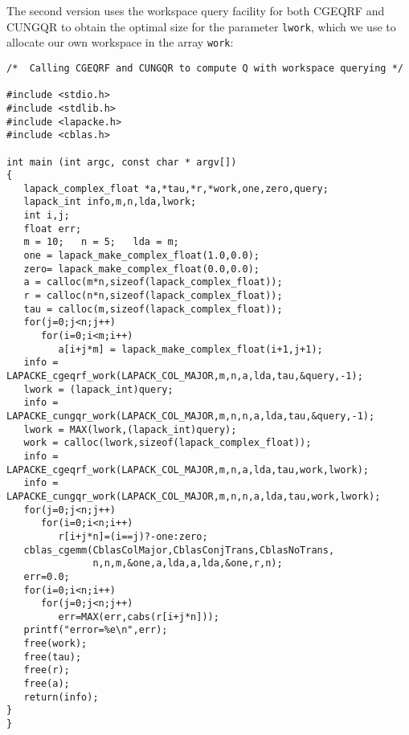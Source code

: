 The second version uses the workspace query facility for both CGEQRF and CUNGQR to obtain the optimal size for the parameter {\tt lwork}, 
which we use to allocate our own workspace in the array {\tt work}:

\begin{verbatim}
/*  Calling CGEQRF and CUNGQR to compute Q with workspace querying */

#include <stdio.h>
#include <stdlib.h>
#include <lapacke.h>
#include <cblas.h>

int main (int argc, const char * argv[])
{
   lapack_complex_float *a,*tau,*r,*work,one,zero,query;
   lapack_int info,m,n,lda,lwork;
   int i,j;
   float err;
   m = 10;   n = 5;   lda = m;
   one = lapack_make_complex_float(1.0,0.0);
   zero= lapack_make_complex_float(0.0,0.0);
   a = calloc(m*n,sizeof(lapack_complex_float));
   r = calloc(n*n,sizeof(lapack_complex_float));
   tau = calloc(m,sizeof(lapack_complex_float));
   for(j=0;j<n;j++)
      for(i=0;i<m;i++)
         a[i+j*m] = lapack_make_complex_float(i+1,j+1);
   info = LAPACKE_cgeqrf_work(LAPACK_COL_MAJOR,m,n,a,lda,tau,&query,-1);
   lwork = (lapack_int)query;
   info = LAPACKE_cungqr_work(LAPACK_COL_MAJOR,m,n,n,a,lda,tau,&query,-1);
   lwork = MAX(lwork,(lapack_int)query);
   work = calloc(lwork,sizeof(lapack_complex_float));
   info = LAPACKE_cgeqrf_work(LAPACK_COL_MAJOR,m,n,a,lda,tau,work,lwork);
   info = LAPACKE_cungqr_work(LAPACK_COL_MAJOR,m,n,n,a,lda,tau,work,lwork);
   for(j=0;j<n;j++)
      for(i=0;i<n;i++)
         r[i+j*n]=(i==j)?-one:zero;
   cblas_cgemm(CblasColMajor,CblasConjTrans,CblasNoTrans,
               n,n,m,&one,a,lda,a,lda,&one,r,n);
   err=0.0;
   for(i=0;i<n;i++)
      for(j=0;j<n;j++)
         err=MAX(err,cabs(r[i+j*n]));
   printf("error=%e\n",err);
   free(work);
   free(tau);
   free(r);
   free(a);
   return(info);
}
}
\end{verbatim}

